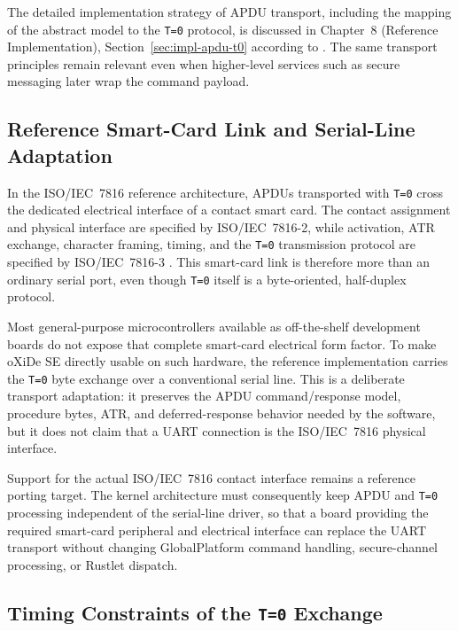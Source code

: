 The detailed implementation strategy of APDU transport, including the mapping
of the abstract model to the \texttt{T=0} protocol, is discussed in
Chapter~8 (Reference Implementation), Section~\ref{sec:impl-apdu-t0}
according to . The same transport principles
remain relevant even when higher-level services such as secure messaging
later wrap the command payload.

\subsection{Reference Smart-Card Link and Serial-Line Adaptation}
\label{sec:apdu-serial-adaptation}

In the ISO/IEC~7816 reference architecture, APDUs transported with
\texttt{T=0} cross the dedicated electrical interface of a contact smart card.
The contact assignment and physical interface are specified by
ISO/IEC~7816-2, while activation, ATR exchange, character framing, timing, and
the \texttt{T=0} transmission protocol are specified by ISO/IEC~7816-3
\cite{iso7816-2,iso7816-3}. This smart-card link is therefore more than an
ordinary serial port, even though \texttt{T=0} itself is a byte-oriented,
half-duplex protocol.

Most general-purpose microcontrollers available as off-the-shelf development
boards do not expose that complete smart-card electrical form factor. To make
oXiDe SE directly usable on such hardware, the reference implementation carries
the \texttt{T=0} byte exchange over a conventional serial line. This is a
deliberate transport adaptation: it preserves the APDU command/response model,
procedure bytes, ATR, and deferred-response behavior needed by the software,
but it does not claim that a UART connection is the ISO/IEC~7816 physical
interface.

Support for the actual ISO/IEC~7816 contact interface remains a reference
porting target. The kernel architecture must consequently keep APDU and
\texttt{T=0} processing independent of the serial-line driver, so that a board
providing the required smart-card peripheral and electrical interface can
replace the UART transport without changing GlobalPlatform command handling,
secure-channel processing, or Rustlet dispatch.

\subsection{Timing Constraints of the \texttt{T=0} Exchange}
\label{sec:apdu-t0-timing}

